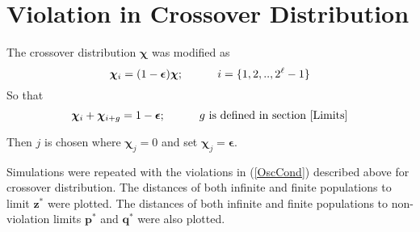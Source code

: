 % 
% 

\section{Violation in Crossover Distribution}
The crossover distribution $\bm{\chi}$ was modified as
\[
\bm{\chi}_i = (1-\bm{\epsilon}) \bm{\chi} ; \hspace{30pt} i = \{1, 2,.., 2^{\ell}-1\} 
\]
So that 
\[
\bm{\chi}_i + \bm{\chi}_{i+g} = 1-\bm{\epsilon} ; \hspace{30pt} g \text{ is defined in  section } \ref{Limits}
\]

Then $j$ is chosen where $\bm{\chi}_j = 0$ and set $\bm{\chi}_j = \bm{\epsilon}$. 

Simulations were repeated with the violations in (\ref{OscCond}) described above for crossover distribution.
The distances of both infinite and finite populations to limit $\bm{z}^\ast$ were plotted. 
The distances of both infinite and finite populations to non-violation limits $\bm{p}^\ast$ and $\bm{q}^\ast$ were also plotted.

